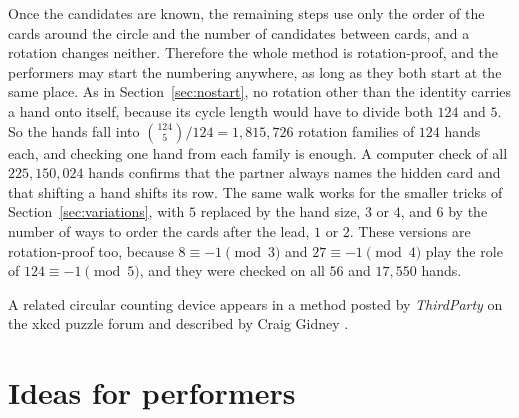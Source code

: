 \documentclass[11pt]{article}
\begin{document}
Once the candidates are known, the remaining steps use only the order of the cards around the circle and the number of candidates between cards, and a rotation changes neither. Therefore the whole method is rotation-proof, and the performers may start the numbering anywhere, as long as they both start at the same place.
As in Section~\ref{sec:nostart}, no rotation other than the identity carries a hand onto itself, because its cycle length would have to divide both $124$ and $5$. So the hands fall into $\binom{124}{5}/124=1{,}815{,}726$ rotation families of $124$ hands each, and checking one hand from each family is enough.
A computer check of all $225{,}150{,}024$ hands confirms that the partner always names the hidden card and that shifting a hand shifts its row. The same walk works for the smaller tricks of Section~\ref{sec:variations}, with $5$ replaced by the hand size, $3$ or $4$, and $6$ by the number of ways to order the cards after the lead, $1$ or $2$. 
These versions are rotation-proof too, because $8\equiv-1\pmod3$ and $27\equiv-1\pmod4$ play the role of $124\equiv-1\pmod5$, and they were checked on all $56$ and $17{,}550$ hands.


A related circular counting device appears in a method posted by \emph{ThirdParty} on the xkcd puzzle forum and described by Craig Gidney \cite{Gidney}. 





\section{Ideas for performers}
\end{document}
